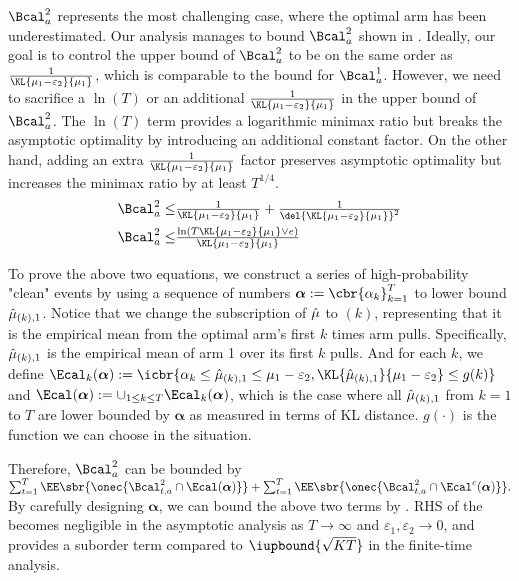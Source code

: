 $\Bcal^2_a$ represents the most challenging case, where the optimal arm has been underestimated. 
Our analysis manages to bound $\Bcal^2_a$ shown in .
Ideally, our goal is to control the upper bound of $\Bcal^2_a$ to be on the same order as $\frac{1}{\KL{\mu_1 - \varepsilon_2}{\mu_1}}$, which is comparable to the bound for $\Bcal^1_a$.
However, we need to sacrifice a $\ln(T)$ or an additional $\frac{1}{\KL{\mu_1-\varepsilon_2}{\mu_1}}$ in the upper bound of $\Bcal^2_a$.
The $\ln(T)$ term provides a logarithmic minimax ratio but breaks the asymptotic optimality by introducing an additional constant factor.
On the other hand, adding an extra $\frac{1}{\KL{\mu_1 - \varepsilon_2}{\mu_1}}$ factor preserves asymptotic optimality but increases the minimax ratio by at least $T^{1/4}$.
\begin{align}
    \Bcal^2_a 
    \leq& 
       \textstyle  \frac{1}{\KL{\mu_1 - \varepsilon_2}{\mu_1}} 
        + \frac{1}{\del{\KL{\mu_1 - \varepsilon_2}{\mu_1}}^2} \label{eqn:bad-case-2-ao}
    \\
    \Bcal^2_a 
    \leq& 
       \textstyle  \frac{\ln(T\KL{\mu_1 - \varepsilon_2}{\mu_1} \vee e)}{\KL{\mu_1 - \varepsilon_2}{\mu_1}} \label{eqn:bad-case-2-mo}
\end{align}

To prove the above two equations, we construct a series of high-probability "clean" events by using a sequence of numbers $\boldsymbol{\alpha}:=\cbr{\alpha_k}_{k=1}^T$ to lower bound ${\hat\mu}_{(k), 1}$. Notice that we change the subscription of ${\hat\mu}$ to $(k)$, representing that it is the empirical mean from the optimal arm's first $k$ times arm pulls. Specifically, ${\hat\mu}_{(k), 1}$ is the empirical mean of arm 1 over its first $k$ pulls.
And for each $k$, we define $\Ecal_k(\boldsymbol{\alpha}):= \icbr{ \alpha_k \leq \hmu_{(k),1} \leq \mu_1-\varepsilon_2, \KL{\hmu_{(k),1}}{\mu_1-\varepsilon_2} \leq g(k) }$ and $\Ecal(\boldsymbol{\alpha}) := \cup_{1\leq k \leq T} \Ecal_k(\boldsymbol{\alpha})$, which is the case where all ${\hat\mu}_{(k), 1}$ from $k=1$ to $T$ are lower bounded by $\boldsymbol{\alpha}$ as measured in terms of KL distance. $g(\cdot)$ is the function we can choose in the situation.

Therefore, $\Bcal^2_a$ can be bounded by
$
    \sum_{t=1}^T \EE\sbr{\onec{\Bcal^2_{t, a} \cap \Ecal(\boldsymbol{\alpha})}}
    +
    \sum_{t=1}^T \EE\sbr{\onec{\Bcal^2_{t, a} \cap \Ecal^c(\boldsymbol{\alpha})}}.
$
By carefully designing $\boldsymbol{\alpha}$, we can bound the above two terms by .
RHS of the  becomes negligible in the asymptotic analysis as $T \to \infty$ and $\varepsilon_1, \varepsilon_2 \to 0$, and  provides a suborder term compared to $\iupbound{\sqrt{KT}}$ in the finite-time analysis.
